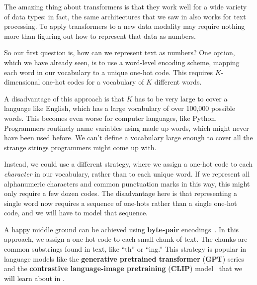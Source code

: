 The amazing thing about transformers is that they work well for a wide variety of data types: in fact, the same architectures that we saw in \chap{\ref{chapter:transformers}} also works for text processing. To apply transformers to a new data modality may require nothing more than 
figuring out how to represent that data as numbers.

So our first question is, how can we represent text as numbers? One option, which we have already seen, is to use a word-level encoding scheme, mapping each word in our vocabulary to a unique one-hot code. This requires $K$-dimensional one-hot codes for a vocabulary of $K$ different words.

A disadvantage of this approach is that $K$ has to be very large to cover a language like English, which has a large vocabulary of over 100,000 possible words. This becomes even worse for computer languages, like Python. Programmers routinely name variables using made up words, which might never have been used before. We can't define a vocabulary large enough to cover all the strange strings programmers might come up with.

Instead, we could use a different strategy, where we assign a one-hot code to each \textit{character} in our vocabulary, rather than to each unique word. If we represent all alphanumeric characters and common punctuation marks in this way, this might only require a few dozen codes. The disadvantage here is that representing a single word now requires a sequence of one-hots rather than a single one-hot code, and we will have to model that sequence.

A happy middle ground can be achieved using \textbf{byte-pair} encodings~\cite{gage1994new}. In this approach, we assign a one-hot code to each small chunk of text. The chunks are common substrings found in text, like ``th'' or ``ing.'' This strategy is popular in language models like the \textbf{generative pretrained transformer} (\textbf{GPT}) series~\cite{brown2020language} and the \textbf{contrastive language-image pretraining} (\textbf{CLIP}) model~\cite{radford2021learning} that we will learn about in \sect{\ref{sec:VLMs:CLIP}}.

